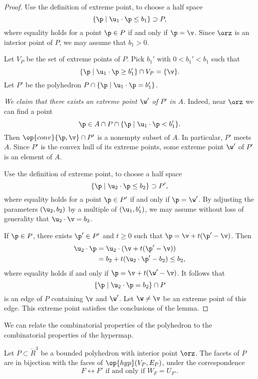 \begin{proof}  Use the definition of extreme point, to choose a half space
\[
\{ \p \mid \u_1\cdot \p \le b_1\} \supset P,
\]
where equality holds for a point $\p\in P$ if and only if $\p=\v$.
Since $\orz$ is an interior point of $P$, we may assume that $b_1 >0$.

Let $V_P$ be the set of extreme points of $P$.
Pick $b_1'$ with $0<b_1'<b_1$ such that
\[
\{\p \mid \u_1\cdot \p \ge b_1' \} \cap V_P = \{\v\}.
\]
Let $P'$ be the polyhedron 
$P \cap \{\p \mid \u_1 \cdot \p = b_1'\}$.  

{\it We claim that there exists an extreme point $\w'$ of $P'$
in $A$.}  Indeed, near $\orz$ we can find a point 
\[
\p \in A \cap P \cap \{ \p \mid \u_1\cdot \p < b_1'\}.
\]
Then $\op{conv}\{\p,\v\}\cap P'$ is a nonempty subset of $A$.  In
particular, $P'$ meets $A$.  Since $P'$ is the convex hull of its
extreme points, some extreme point $\w'$ of $P'$ is an element of $A$.

Use the definition of extreme point, to choose a half space
\[
\{ \p \mid \u_2 \cdot \p \le b_2\} \supset P',
\]
where equality holds for a point $\p\in P'$ if and only if $\p=\w'$.
By adjusting the parameters $(\u_2,b_2)$ by a multiple of
$(\u_1,b'_1)$, we may assume without loss of generality that $\u_2\cdot
\v = b_2$.

If $\p\in P$, there  exists $\p'\in P'$ and $t\ge0$ such that $\p
= \v + t (\p'-\v)$.  Then
\begin{align*}
\u_2\cdot \p &= \u_2\cdot (\v + t (\p'-\v))\\
&= b_2 + t (\u_2\cdot \p' - b_2) \le b_2,
\end{align*}
where equality holds if and only if $\p = \v + t (\w' - \v)$.   It
follows that
\[
\{\p \mid \u_2 \cdot \p = b_2\} \cap P
\]
is an edge of $P$ containing $\v$ and $\w'$.  Let $\w\ne\v$ be an
extreme point of this edge.  This extreme point satisfies the
conclusions of the lemma.
\end{proof}

We can relate the combinatorial properties of the polyhedron to the
combinatorial properties of the hypermap.

\begin{lemma}[]\cutrate{}\label{lemma:facet-bi}
Let $P\subset\ring{R}^3$ be a bounded polyhedron with interior point
$\orz$.  The facets of $P$ are in bijection with the faces of
$\op{hyp}(V_P,E_P)$, under the correspondence
\[ 
F\leftrightarrow F' \text{ if and only if } W_F = U_{F'}.
\] 
\end{lemma}

